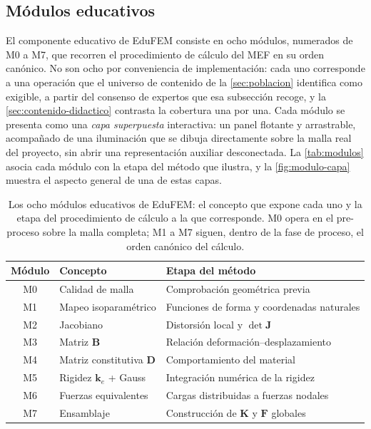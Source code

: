 \subsection{Módulos educativos}
\label{sec:educacion}

El componente educativo de EduFEM consiste en ocho módulos, numerados de M0 a M7, que recorren el procedimiento de cálculo del MEF en su orden canónico. No son ocho por conveniencia de implementación: cada uno corresponde a una operación que el universo de contenido de la \autoref{sec:poblacion} identifica como exigible, a partir del consenso de expertos que esa subsección recoge, y la \autoref{sec:contenido-didactico} contrasta la cobertura una por una. Cada módulo se presenta como una \emph{capa superpuesta} interactiva: un panel flotante y arrastrable, acompañado de una iluminación que se dibuja directamente sobre la malla real del proyecto, sin abrir una representación auxiliar desconectada. La \autoref{tab:modulos} asocia cada módulo con la etapa del método que ilustra, y la \autoref{fig:modulo-capa} muestra el aspecto general de una de estas capas.

\begin{table}[H]
\centering
\caption[Los ocho módulos educativos de EduFEM.]{Los ocho módulos educativos de EduFEM: el concepto que expone cada uno y la etapa del procedimiento de cálculo a la que corresponde. M0 opera en el pre-proceso sobre la malla completa; M1 a M7 siguen, dentro de la fase de proceso, el orden canónico del cálculo.}
\label{tab:modulos}
\begin{tabular}{@{}cll@{}}
\toprule
\textbf{Módulo} & \textbf{Concepto} & \textbf{Etapa del método} \\
\midrule
M0 & Calidad de malla        & Comprobación geométrica previa \\
M1 & Mapeo isoparamétrico    & Funciones de forma y coordenadas naturales \\
M2 & Jacobiano               & Distorsión local y $\det\bm{J}$ \\
M3 & Matriz $\bm{B}$         & Relación deformación--desplazamiento \\
M4 & Matriz constitutiva $\bm{D}$ & Comportamiento del material \\
M5 & Rigidez $\bm{k}_e$ + Gauss & Integración numérica de la rigidez \\
M6 & Fuerzas equivalentes    & Cargas distribuidas a fuerzas nodales \\
M7 & Ensamblaje              & Construcción de $\bm{K}$ y $\bm{F}$ globales \\
\bottomrule
\end{tabular}
\end{table}


